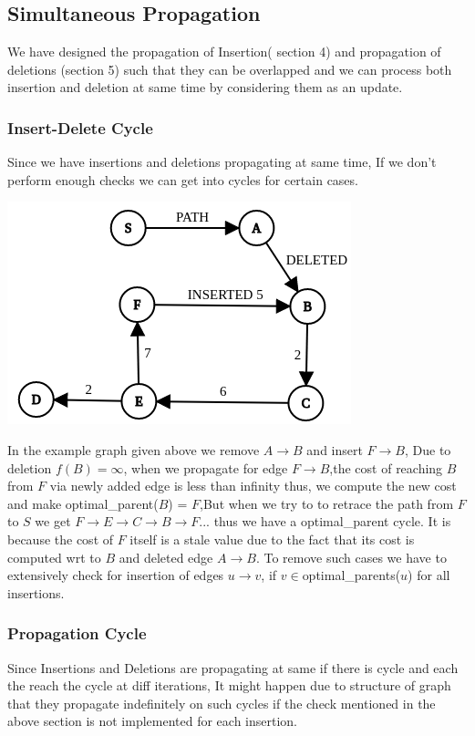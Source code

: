 \documentclass[a4paper]{article}
\begin{document}
\subsection{Simultaneous Propagation}
We have designed the propagation of Insertion( section 4) and propagation of deletions (section 5) such that they can be overlapped and we can process both insertion and deletion at same time by considering them as an update.

\subsubsection{Insert-Delete Cycle}
Since we have insertions and deletions propagating at same time, If we don't perform enough checks we can get into cycles for certain cases. 
\begin{center}
\includegraphics[scale=0.45]{img/ins_del_cycle.png}        
\end{center}
In the example graph given above we remove $A \rightarrow B$ and insert $F \rightarrow B$, Due to deletion $f(B) = \infty$, when we propagate for edge $F \rightarrow B$,the cost of reaching $B$ from $F$ via newly added edge is less than infinity thus, we compute the new cost and make optimal\_parent($B$) = $F$,But when we try to to retrace the path from $F$ to $S$ we get $F\rightarrow E\rightarrow C\rightarrow B\rightarrow F...$ thus we have a optimal\_parent cycle. It is because the cost of $F$ itself is a stale value due to the fact that its cost is computed wrt to $B$ and deleted edge $A \rightarrow B$. To remove such cases we have to extensively check for insertion of edges $u \rightarrow v$, if $v \in $optimal\_parents($u$) for all insertions.\\

\subsubsection{Propagation Cycle}
Since Insertions and Deletions are propagating at same if there is cycle and each the reach the cycle at diff iterations, It might happen due to structure of graph that they propagate indefinitely on such cycles if the check mentioned in the above section is not implemented for each insertion.  
\end{document}
